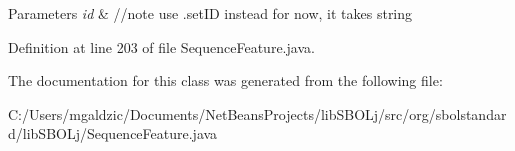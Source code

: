 \begin{DoxyParams}{Parameters}
{\em id} & //note use .setID instead for now, it takes string  \\
\hline
\end{DoxyParams}


Definition at line 203 of file SequenceFeature.java.



The documentation for this class was generated from the following file:\begin{DoxyCompactItemize}
\item 
C:/Users/mgaldzic/Documents/NetBeansProjects/libSBOLj/src/org/sbolstandard/libSBOLj/SequenceFeature.java\end{DoxyCompactItemize}
